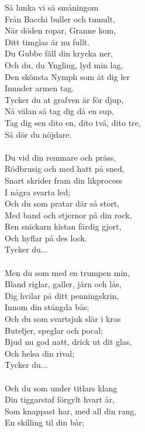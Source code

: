 \vspace{10pt}
Så lunka vi så småningom\\
Från Bacchi buller och tumult,\\
När döden ropar, Granne kom,\\
Ditt timglas är nu fullt.\\
Du Gubbe fäll din krycka ner,\\
Och du, du Yngling, lyd min lag,\\
Den skönsta Nymph som åt dig ler\\
Inunder armen tag.\\
Tycker du at grafven är för djup,\\
Nå välan så tag dig då en sup,\\
Tag dig sen dito en, dito två, dito tre,\\
Så dör du nöjdare.\\
\\
Du vid din remmare och präss,\\
Rödbrusig och med hatt på sned,\\
Snart skrider fram din likprocess\\
I några svarta led;\\
Och du som pratar där så stort,\\
Med band och stjernor på din rock,\\
Ren snickarn kistan färdig gjort,\\
Och hyflar på des lock.\\
Tycker du...\\
\\
Men du som med en trumpen min,\\
Bland riglar, galler, järn och lås,\\
Dig hvilar på ditt penningskrin,\\
Innom din stängda bås;\\
Och du som svartsjuk slår i kras\\
Buteljer, speglar och pocal;\\
Bjud nu god natt, drick ut dit glas,\\
Och helsa din rival;\\
Tycker du...\\
\\
Och du som under titlars klang\\
Din tiggarstaf förgylt hvart år,\\
Som knappast har, med all din rang,\\
En skilling til din bår;\\
